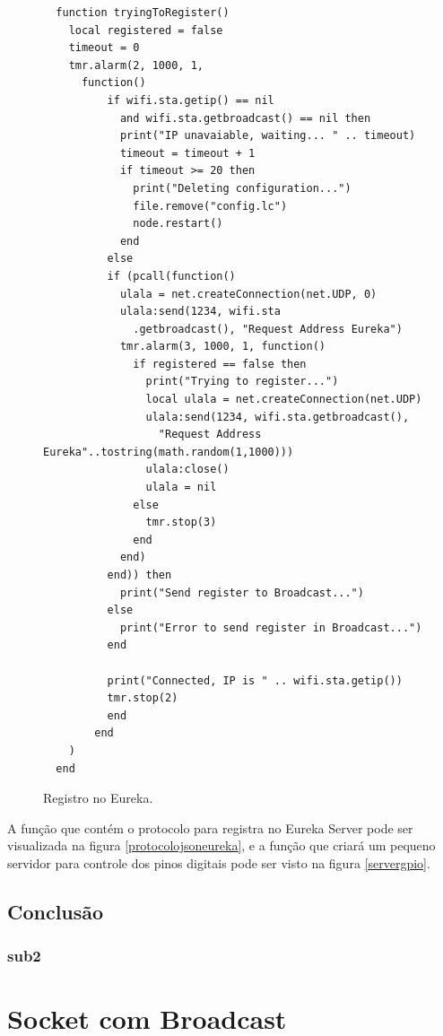 \documentclass[journal]{IEEEtran}
\begin{document}
\begin{figure}[H]
\centering

\begin{lstlisting}
  function tryingToRegister()
    local registered = false
    timeout = 0
    tmr.alarm(2, 1000, 1,
      function()
          if wifi.sta.getip() == nil 
            and wifi.sta.getbroadcast() == nil then
            print("IP unavaiable, waiting... " .. timeout)
            timeout = timeout + 1
            if timeout >= 20 then
              print("Deleting configuration...")
              file.remove("config.lc")
              node.restart()
            end
          else
          if (pcall(function()
            ulala = net.createConnection(net.UDP, 0)
            ulala:send(1234, wifi.sta
              .getbroadcast(), "Request Address Eureka")
            tmr.alarm(3, 1000, 1, function()
              if registered == false then
                print("Trying to register...")
                local ulala = net.createConnection(net.UDP)
                ulala:send(1234, wifi.sta.getbroadcast(), 
                  "Request Address Eureka"..tostring(math.random(1,1000)))
                ulala:close()
                ulala = nil
              else
                tmr.stop(3)
              end
            end)
          end)) then
            print("Send register to Broadcast...")
          else
            print("Error to send register in Broadcast...")
          end
          
          print("Connected, IP is " .. wifi.sta.getip())
          tmr.stop(2)
          end
        end
    )
  end
\end{lstlisting}
\caption{Registro no Eureka.}
\label{tryingToRegisterFN}
\end{figure}

A função que contém o protocolo para registra no Eureka Server pode ser visualizada na figura \ref{protocolojsoneureka}, e a função que criará um pequeno servidor para controle dos pinos digitais pode ser visto na figura \ref{servergpio}.

\subsection{Conclusão}
\subsubsection{sub2}


\appendices
\section{Socket com Broadcast}
\end{document}
